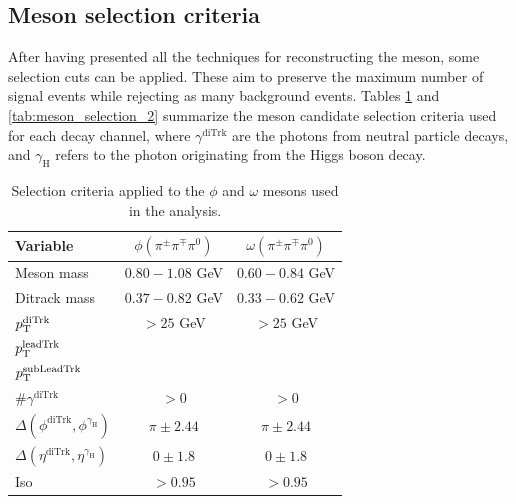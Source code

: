 \subsection{Meson selection criteria}\label{subsec:meson_selection}

After having presented all the techniques for reconstructing the meson, some selection cuts can be applied. These aim to preserve the maximum number of signal events while rejecting as many background events. Tables \ref{tab:meson_selection_1} and \ref{tab:meson_selection_2} summarize the meson candidate selection criteria used for each decay channel, where $\gamma^{\text{diTrk}}$ are the photons from neutral particle decays, and $\gamma_\text{H}$ refers to the photon originating from the Higgs boson decay.
\begin{table}[!ht]
    \centering
    \begin{tabular}{|l|c|c|}
        \hline
        \cellcolor{lightgray}Variable & \cellcolor{lightgray}$\phi(\pi^{\pm}\pi^{\mp}\pi^{0})$ & \cellcolor{lightgray}$\omega(\pi^{\pm}\pi^{\mp}\pi^{0})$ \\ \hline
        Meson mass                                              &$0.80-1.08$ GeV  &$0.60-0.84$ GeV    \\
        Ditrack mass                                            &$0.37-0.82$ GeV  &$0.33-0.62$ GeV      \\
        $p_\text{T}^{\text{diTrk}}$                                    &$>25$ GeV        &$>25$ GeV              \\
        $p_\text{T}^{\text{leadTrk}}$                                  &         &               \\
        $p_\text{T}^{\text{subLeadTrk}}$                               &         &           \\
        $\#\gamma^{\text{diTrk}}$                               &$>0$             &$>0$                   \\
        $\Delta(\phi^{\text{diTrk}}, \phi^{\gamma_\text{H}})$   &$\pi\pm2.44$     &$\pi\pm2.44$        \\
        $\Delta(\eta^{\text{diTrk}}, \eta^{\gamma_\text{H}})$   &$0\pm1.8$        &$0\pm1.8$              \\
        Iso                                                     &$>0.95$          &$>0.95$                \\
        \hline
        \end{tabular}
    \caption{Selection criteria applied to the $\phi$ and $\omega$ mesons used in the analysis.}
    \label{tab:meson_selection_1}
\end{table}

